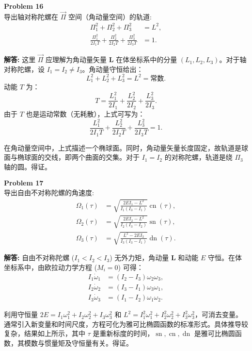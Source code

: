 \documentclass[12pt, a4paper, oneside]{ctexart}
\newenvironment{solution}{\par\noindent\textbf{解答:}\quad}{\par}
\begin{document}
\begin{mdframed}[backgroundcolor=gray!10, linewidth=0pt]
    \textbf{Problem 16} \\
    导出轴对称陀螺在 \(\vec{\Pi}\) 空间（角动量空间）的轨道:
    \[
    \begin{aligned}
        \Pi_1^2 + \Pi_2^2 + \Pi_3^2 &= L^2, \\
        \frac{\Pi_1^2}{2 I_1 T} + \frac{\Pi_2^2}{2 I_2 T} + \frac{\Pi_3^2}{2 I_3 T} &= 1.
    \end{aligned}
    \]
\end{mdframed}
\begin{solution}
    这里 \(\vec{\Pi}\) 应理解为角动量矢量 \(\mathbf{L}\) 在体坐标系中的分量 \((L_1, L_2, L_3)\)。对于轴对称陀螺，设 \(I_1 = I_2 \neq I_3\)。角动量守恒给出：
    \[
    L_1^2 + L_2^2 + L_3^2 = L^2 = \text{常数}.
    \]
    动能 \(T\) 为：
    \[
    T = \frac{L_1^2}{2I_1} + \frac{L_2^2}{2I_2} + \frac{L_3^2}{2I_3}.
    \]
    由于 \(T\) 也是运动常数（无耗散），上式可写为：
    \[
    \frac{L_1^2}{2I_1 T} + \frac{L_2^2}{2I_2 T} + \frac{L_3^2}{2I_3 T} = 1.
    \]
    
    在角动量空间中，上式描述一个椭球面。同时，角动量矢量长度固定，故轨道是球面与椭球面的交线，即两个曲面的交集。对于 \(I_1 = I_2\) 的对称陀螺，轨道是绕 \(\Pi_3\) 轴的圆。得证。
\end{solution}

\begin{mdframed}[backgroundcolor=gray!10, linewidth=0pt]
    \textbf{Problem 17} \\
    导出自由不对称陀螺的角速度:
    \[
    \begin{aligned}
        \Omega_1(\tau) &= \sqrt{\frac{2 E I_1 - L^2}{I_1(I_3 - I_1)}} \operatorname{cn}(\tau), \\
        \Omega_2(\tau) &= \sqrt{\frac{2 E I_2 - L^2}{I_2(I_3 - I_2)}} \operatorname{sn}(\tau), \\
        \Omega_3(\tau) &= \sqrt{\frac{L^2 - 2 E I_3}{I_3(I_3 - I_1)}} \operatorname{dn}(\tau).
    \end{aligned}
    \]
\end{mdframed}
\begin{solution}
    自由不对称陀螺 (\(I_1 < I_2 < I_3\)) 无外力矩，角动量 \(\mathbf{L}\) 和动能 \(E\) 守恒。在体坐标系中，由欧拉动力学方程 (\(M_i=0\)) 可得：
    \[
    \begin{aligned}
        I_1 \dot{\omega}_1 &= (I_2 - I_3) \omega_2 \omega_3, \\
        I_2 \dot{\omega}_2 &= (I_3 - I_1) \omega_3 \omega_1, \\
        I_3 \dot{\omega}_3 &= (I_1 - I_2) \omega_1 \omega_2.
    \end{aligned}
    \]
    
    利用守恒量 \(2E = I_1 \omega_1^2 + I_2 \omega_2^2 + I_3 \omega_3^2\) 和 \(L^2 = I_1^2 \omega_1^2 + I_2^2 \omega_2^2 + I_3^2 \omega_3^2\)，可消去变量。通常引入新变量和时间尺度，方程可化为雅可比椭圆函数的标准形式。具体推导较复杂，结果如上所示，其中 \(\tau\) 是重新标度的时间，\(\operatorname{sn}, \operatorname{cn}, \operatorname{dn}\) 是雅可比椭圆函数，其模数与惯量矩及守恒量有关。得证。
\end{solution}
\end{document}
